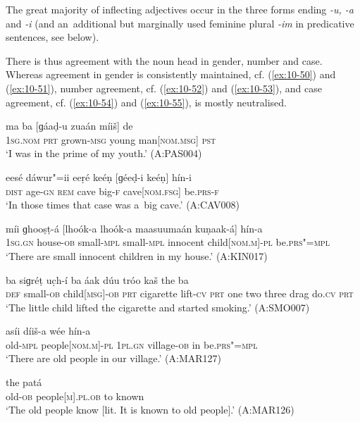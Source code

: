 The great majority of inflecting adjectives occur in the three forms ending \textit{-u, -a} and \textit{-i} (and an~additional but marginally used feminine plural \textit{-im} in predicative sentences, see  below).


There is thus agreement with the noun head in gender, number and case. Whereas agreement in gender is consistently maintained, cf. (\ref{ex:10-50}) and (\ref{ex:10-51}), number agreement, cf. (\ref{ex:10-52}) and (\ref{ex:10-53}), and case agreement, cf. (\ref{ex:10-54}) and (\ref{ex:10-55}), is mostly neutralised. 

\begin{exe}
\ex
\label{ex:10-50}
\gll ma ba [ɡáaḍ-u zuaán míiš] de \\
\textsc{1sg.nom} \textsc{prt} grown-\textsc{msg} young man[\textsc{nom}.\textsc{msg}] \textsc{pst} \\
\glt `I was in the prime of my youth.' (A:PAS004)

\ex
\label{ex:10-51}
\gll eesé dáwur"=ii eeṛé keéṇ [ɡéeḍ-i keéṇ] hín-i \\
\textsc{dist} age-\textsc{gn} \textsc{rem} cave big-\textsc{f} cave[\textsc{nom}.\textsc{fsg}] be.\textsc{prs-f} \\
\glt `In those times that case was a~big cave.' (A:CAV008)

\ex
\label{ex:10-52}
\gll míi ɡhooṣṭ-á [lhoók-a lhoók-a maasuumaán kuṇaak-á] hín-a \\
\textsc{1sg.gn} house-\textsc{ob} small-\textsc{mpl} small-\textsc{mpl}  innocent child[\textsc{nom.m}]-\textsc{pl} be.\textsc{prs"=mpl}\\
\glt `There are small innocent children in my house.' (A:KIN017)

\ex
\label{ex:10-53}
 ba siɡréṭ uc̣h-í ba áak dúu tróo kaš the ba \\
\textsc{def} small-\textsc{ob} child[\textsc{msg}]-\textsc{ob} \textsc{prt} cigarette lift-\textsc{cv} \textsc{prt } one two three drag do.\textsc{cv} \textsc{prt}  \\
\glt `The little child lifted the cigarette and started smoking.' (A:SMO007)

\ex
\label{ex:10-54}
 asíi díiš-a wée hín-a \\
old-\textsc{mpl} people[\textsc{nom.m}]-\textsc{pl} \textsc{1pl.gn} village-\textsc{ob} in be.\textsc{prs"=mpl} \\
\glt `There are old people in our village.' (A:MAR127)

\ex
\label{ex:10-55}
 the patá \\
old-\textsc{ob} people[\textsc{m}].\textsc{pl.ob} to known \\
\glt `The old people know [lit. It is known to old people].' (A:MAR126)
\end{exe}



